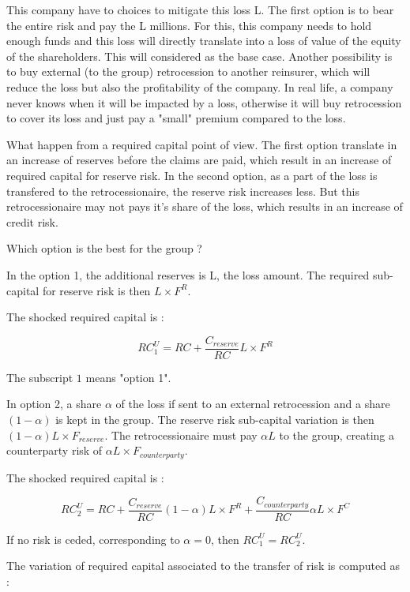This company have to choices to mitigate this loss L. The first option is to bear the entire risk and pay the L millions. For this, this company needs to hold enough funds and this loss will directly translate into a loss of value of the equity of the shareholders. This will considered as the base case.
Another possibility is to buy external (to the group) retrocession to another reinsurer, which will reduce the loss but also the profitability of the company. 
In real life, a company never knows when it will be impacted by a loss, otherwise it will buy retrocession to cover its loss and just pay a "small" premium compared to the loss.

What happen from a required capital point of view. The first option translate in an increase of reserves before the claims are paid, which result in an increase of required capital for reserve risk.
In the second option, as a part of the loss is transfered to the retrocessionaire, the reserve risk increases less. But this retrocessionaire may not pays it's share of the loss, which results in an increase of credit risk.

Which option is the best for the group ?

In the option 1, the additional reserves is L, the loss amount. The required sub-capital for reserve risk is then $L \times F^R$. 

The shocked required capital is :

\begin{equation}
	RC^U_1 = RC + \frac{C_{reserve}}{RC} L \times F^R
\end{equation}

The subscript $1$ means "option 1".

In option 2, a share $\alpha$ of the loss if sent to an external retrocession and a share $(1-\alpha)$ is kept in the group. The reserve risk sub-capital variation is then $(1-\alpha) L \times F_{reserve}$. The retrocessionaire must pay $\alpha L$ to the group, creating a counterparty risk of $\alpha L \times F_{counterparty}$.  

The shocked required capital is :

\begin{equation}
	RC^U_2 = RC + \frac{C_{reserve}}{RC} (1-\alpha) L \times F^R + \frac{C_{counterparty}}{RC} \alpha L \times F^C
\end{equation}

If no risk is ceded, corresponding to $\alpha = 0$, then $RC^U_1 = RC^U_2$.


The variation of required capital associated to the transfer of risk is computed as :


